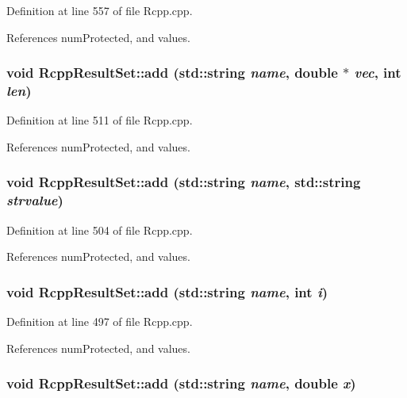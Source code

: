 Definition at line 557 of file Rcpp.cpp.

References numProtected, and values.\hypertarget{classRcppResultSet_a5d06d8a4f0497abc6fad4ea22b4934f9}{
\subsubsection[{add}]{\setlength{\rightskip}{0pt plus 5cm}void RcppResultSet::add (std::string {\em name}, \/  double $\ast$ {\em vec}, \/  int {\em len})}}
\label{classRcppResultSet_a5d06d8a4f0497abc6fad4ea22b4934f9}


Definition at line 511 of file Rcpp.cpp.

References numProtected, and values.\hypertarget{classRcppResultSet_a2633372ab2f50b269e9e26dd7a489492}{
\subsubsection[{add}]{\setlength{\rightskip}{0pt plus 5cm}void RcppResultSet::add (std::string {\em name}, \/  std::string {\em strvalue})}}
\label{classRcppResultSet_a2633372ab2f50b269e9e26dd7a489492}


Definition at line 504 of file Rcpp.cpp.

References numProtected, and values.\hypertarget{classRcppResultSet_a8b7841ff8a52477b0c6a1fb7c03c0fd9}{
\subsubsection[{add}]{\setlength{\rightskip}{0pt plus 5cm}void RcppResultSet::add (std::string {\em name}, \/  int {\em i})}}
\label{classRcppResultSet_a8b7841ff8a52477b0c6a1fb7c03c0fd9}


Definition at line 497 of file Rcpp.cpp.

References numProtected, and values.\hypertarget{classRcppResultSet_a7c7da37f18bd352303bf06b7c5233bc4}{
\subsubsection[{add}]{\setlength{\rightskip}{0pt plus 5cm}void RcppResultSet::add (std::string {\em name}, \/  double {\em x})}}
\label{classRcppResultSet_a7c7da37f18bd352303bf06b7c5233bc4}


